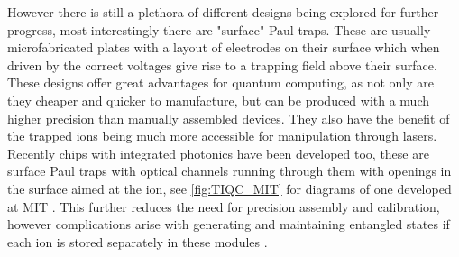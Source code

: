 However there is still a plethora of different designs being explored for further progress, most interestingly there are "surface" Paul traps.
These are usually microfabricated plates with a layout of electrodes on their surface which when driven by the correct voltages give rise to a trapping field above their surface.
These designs offer great advantages for quantum computing, as not only are they cheaper and quicker to manufacture, but can be produced with a much higher precision than manually assembled devices.
They also have the benefit of the trapped ions being much more accessible for manipulation through lasers.
Recently chips with integrated photonics have been developed too, these are surface Paul traps with optical channels running through them with openings in the surface aimed at the ion\footnotemark, see \cref{fig:TIQC_MIT} for diagrams of one developed at MIT \cite{niffeneggerIntegratedMultiwavelengthControl2020}.
This further reduces the need for precision assembly and calibration, however complications arise with generating and maintaining entangled states if each ion is stored separately in these modules \cite{bruzewiczTrappedionQuantumComputing2019}.


